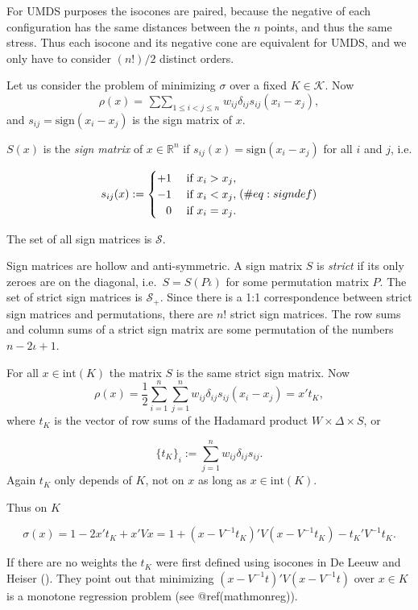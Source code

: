 \documentclass[
  12pt,
  letterpaper,
  DIV=11,
  numbers=noendperiod]{scrreprt}
\theoremstyle{remark}
\begin{document}
For UMDS purposes the isocones are paired, because the negative of each
configuration has the same distances between the \(n\) points, and thus
the same stress. Thus each isocone and its negative cone are equivalent
for UMDS, and we only have to consider \((n!)/2\) distinct orders.

Let us consider the problem of minimizing \(\sigma\) over a fixed
\(K\in\mathcal{K}\). Now \[
\rho(x)=\mathop{\sum\sum}_{1\leq i<j\leq n}w_{ij}\delta_{ij}s_{ij}(x_i-x_j),
\] and \(s_{ij}=\text{sign}(x_i-x_j)\) is the sign matrix of \(x\).

\(S(x)\) is the \emph{sign matrix} of \(x\in\mathbb{R}^n\) if
\(s_{ij}(x)=\text{sign}(x_i-x_j)\) for all \(i\) and \(j\), i.e.

\begin{equation}
s_{ij}(x):=\begin{cases}+1&\text{ if }x_i>x_j,\\
-1&\text{ if }x_i<x_j,\\
\hfill 0&\text{ if }x_i=x_j.
\end{cases}
(\#eq:signdef)
\end{equation}

The set of all sign matrices is \(\mathcal{S}\).

Sign matrices are hollow and anti-symmetric. A sign matrix \(S\) is
\emph{strict} if its only zeroes are on the diagonal,
i.e.~\(S=S(P\iota)\) for some permutation matrix \(P\). The set of
strict sign matrices is \(\mathcal{S}_+\). Since there is a 1:1
correspondence between strict sign matrices and permutations, there are
\(n!\) strict sign matrices. The row sums and column sums of a strict
sign matrix are some permutation of the numbers \(n-2\iota+1\).

For all \(x\in\text{int}(K)\) the matrix \(S\) is the same strict sign
matrix. Now \[
\rho(x)=\frac12\sum_{i=1}^n\sum_{j=1}^nw_{ij}\delta_{ij}s_{ij}(x_i-x_j)=x't_K,
\] where \(t_K\) is the vector of row sums of the Hadamard product
\(W\times\Delta\times S\), or

\[
\{t_K\}_i:=\sum_{j=1}^nw_{ij}\delta_{ij}s_{ij}.
\] Again \(t_K\) only depends of \(K\), not on \(x\) as long as
\(x\in\text{int}(K)\).

Thus on \(K\)

\[
\sigma(x)=1-2x't_K+x'Vx=1+(x-V^{-1}t_K)'V(x-V^{-1}t_K)-t_K'V^{-1}t_K^{\ }.
\]

If there are no weights the \(t_K\) were first defined using isocones in
De Leeuw and Heiser (). They
point out that minimizing \((x-V^{-1}t)'V(x-V^{-1}t)\) over \(x\in K\)
is a monotone regression problem (see @ref(mathmonreg)).
\end{document}
